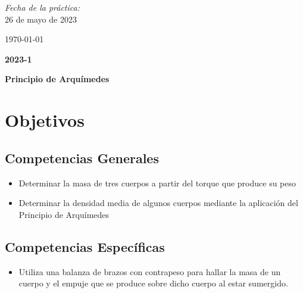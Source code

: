 \documentclass[10pt]{article}
\begin{document}
\begin{center}
\vspace{-2.4cm}	
\begin{minipage}{0.98\textwidth}
\begin{flushright}	
\large
\emph{Fecha de la práctica:}\\
\vspace{0.2cm}
26 de mayo de 2023 
\end{flushright}
\end{minipage}

 \vspace{2.4cm}

\large{\today}\\
\vspace{0.3cm}

{ \Large\bfseries 2023-1}
										 			
\end{center}							 											
																					
\newpage																		

\tableofcontents 
\setcounter{page}{1}


\newpage


\begin{center}
    \textbf{\huge Principio de Arquímedes}
\end{center}

\section{Objetivos}
\subsection{Competencias Generales}
\begin{itemize}
    \item Determinar la masa de tres cuerpos a partir del torque que produce su peso
    \item Determinar la densidad media de algunos cuerpos mediante la aplicación del Principio de Arquímedes
\end{itemize} 

\subsection{Competencias Específicas}
\begin{itemize}
    \item Utiliza una balanza de brazos con contrapeso para hallar la masa de un cuerpo y el empuje que se produce sobre dicho cuerpo al estar sumergido.

\end{itemize}
\end{document}
